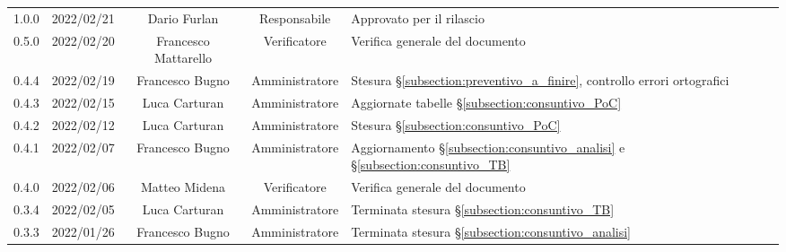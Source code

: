 \begin{center}
\begin{longtable}[c]{c | c | c | c | p{5cm}}
		1.0.0                                                      & 2022/02/21 & Dario Furlan         & Responsabile   & Approvato per il rilascio                                                                                                                 \\
		0.5.0                                                      & 2022/02/20 & Francesco Mattarello & Verificatore   & Verifica generale del documento                                                                                                           \\
		0.4.4                                                      & 2022/02/19 & Francesco Bugno      & Amministratore & Stesura §\ref{subsection:preventivo_a_finire}, controllo errori ortografici                                                               \\
		0.4.3                                                      & 2022/02/15 & Luca Carturan        & Amministratore & Aggiornate tabelle §\ref{subsection:consuntivo_PoC}                                                                                       \\
		0.4.2                                                      & 2022/02/12 & Luca Carturan        & Amministratore & Stesura §\ref{subsection:consuntivo_PoC}                                                                                                  \\
		0.4.1                                                      & 2022/02/07 & Francesco Bugno      & Amministratore & Aggiornamento §\ref{subsection:consuntivo_analisi} e §\ref{subsection:consuntivo_TB}                                                      \\
		0.4.0                                                      & 2022/02/06 & Matteo Midena        & Verificatore   & Verifica generale del documento                                                                                                           \\
		0.3.4                                                      & 2022/02/05 & Luca Carturan        & Amministratore & Terminata stesura §\ref{subsection:consuntivo_TB}                                                                                         \\
		0.3.3                                                      & 2022/01/26 & Francesco Bugno      & Amministratore & Terminata stesura §\ref{subsection:consuntivo_analisi}                                                                                    \\

\end{longtable}
\end{center}
